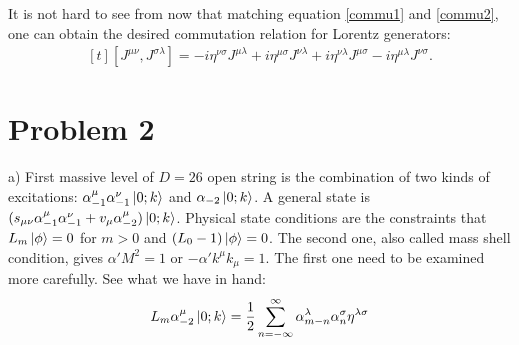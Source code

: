 \documentclass[12pt]{article}
\begin{document}
It is not hard to see from now that matching equation \ref{commu1} and \ref{commu2}, one can obtain the desired commutation relation for Lorentz generators:
\begin{equation}
\begin{aligned}[t]
[J^{\mu\nu}, J^{\sigma\lambda}]=-i\eta^{\nu\sigma}J^{\mu\lambda}+i\eta^{\mu\sigma}J^{\nu\lambda}+i\eta^{\nu\lambda}J^{\mu\sigma}-i\eta^{\mu\lambda}J^{\nu\sigma}.
\end{aligned}
\end{equation}
\section{Problem 2}
\begin{paragraph}{a)}
First massive level of $D=26$ open string is the combination of two kinds of excitations: $\alpha_{-1}^\mu\alpha_{-1}^\nu\ket{0;k}$ and $\alpha_{-2}\ket{0;k}$. A general state is $(s_{\mu\nu}\alpha_{-1}^\mu\alpha_{-1}^\nu+v_\mu\alpha_{-2}^\mu)\ket{0;k}$. Physical state conditions are the constraints that $L_m\ket{\phi}=0$ for $m>0$ and $(L_0-1)\ket{\phi}=0$.  The second one, also called mass shell condition, gives $\alpha' M^2=1$ or $-\alpha' k^\mu k_\mu=1$. The first one need to be examined more carefully. See what we have in hand:
\begin{equation}
\begin{aligned}[t]
L_m \alpha_{-2}^\mu \ket{0;k}=\frac{1}{2}\sum\limits_{n=-\infty}^{\infty}\alpha_{m-n}^\lambda\alpha_n^\sigma \eta^{\lambda\sigma}
\end{aligned}
\end{equation}
\end{paragraph}
\end{document}
